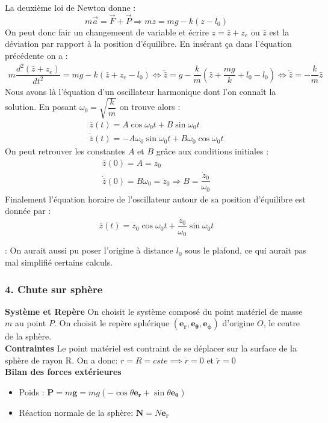 \documentclass[a4paper,10pt,twoside]{article}
\begin{document}
\noindent La deuxième loi de Newton donne : 
\begin{equation*}
    m\vec a = \vec F+\vec P \Rightarrow m\ddot z = mg-k(z-l_0)
\end{equation*}
On peut donc fair un changemeent de variable et écrire $z = \bar z+z_e$ ou $\bar z$ est la déviation par rapport à la position d'équilibre. En insérant ça dans l'équation précédente on a : 
\begin{gather*}
    m\dfrac{d^2(\bar z+z_e)}{dt^2}=mg-k(\bar z+z_e-l_0)
    \iff \ddot {\bar z} = g -\dfrac{k}{m}(\bar z+ \dfrac{mg}{k}+l_0-l_0)\iff \ddot {\bar z}= -\dfrac{k}{m}\bar z 
\end{gather*}
Nous avons là l'équation d'un oscillateur harmonique dont l'on connaît la solution. En posant $\omega_0 = \sqrt{\dfrac{k}{m}}$ on trouve alors :
\begin{gather*}
    \bar z(t) = A\cos{\omega_0t}+ B\sin{\omega_0t} \\
     \dot{\bar z}(t) = -A\omega_0\sin{\omega_0t} +B\omega_0\cos{\omega_0t}
\end{gather*}
On peut retrouver les constantes $A$ et $B$ grâce aux conditions initiales : 
\begin{gather*}
    \bar z(0)=A=z_0 \\
    \dot {\bar z}(0) = B\omega_0 = \dot z_0 \Rightarrow B = \dfrac{\dot z_0}{\omega_0}
\end{gather*}
Finalement l'équation horaire de l'oscillateur autour de sa position d'équilibre est donnée par : 
\begin{equation*}
     \bar z(t) = z_0\cos{\omega_0t}+ \dfrac{\dot z_0}{\omega_0}\sin{\omega_0t}
\end{equation*}

 : On aurait aussi pu poser l'origine à distance $l_0$ sous le plafond, ce qui aurait pas mal simplifié certains calculs.

\newpage

\subsubsection*{4. Chute sur sphère}
\noindent \textbf{Système et Repère} On choisit le système composé du point matériel de masse $m$ au point $P$. On choisit le repère sphérique $(\mathbf{e_r, e_\theta, e_\phi})$ d'origine $O$, le centre de la sphère. \\
\textbf{Contraintes} Le point matériel est contraint de se déplacer sur la surface de la sphère de rayon R. On a donc: $r = R = cste \implies \dot{r} = 0$ et $\ddot{r} = 0$ \\
\textbf{Bilan des forces extérieures}
\begin{itemize}
    \item Poids : $\mathbf{P} = m \mathbf{g} = mg (-\cos{\theta} \mathbf{e_r} + \sin{\theta} \mathbf{e_\theta})$
    \item Réaction normale de la sphère: $\mathbf{N} = N \mathbf{e_r}$
\end{itemize}
\end{document}
